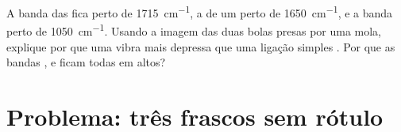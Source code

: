 \begin{exercise}[$\star\star\star$]\label{exo:g11:infrared:15}
A banda  das  fica perto de \qty{1715}{cm^{-1}}, a de um
 perto de \qty{1650}{cm^{-1}}, e a banda  perto de
\qty{1050}{cm^{-1}}. Usando a imagem das duas bolas presas por uma mola,
explique por que uma   vibra mais depressa que uma
ligação simples . Por que as bandas ,  e
 ficam todas em  altos?
\end{exercise}

\section{Problema: três frascos sem rótulo}

